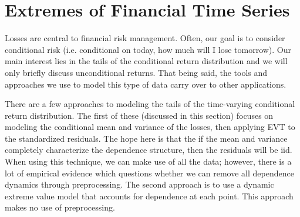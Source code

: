 \documentclass{article}
\theoremstyle{definition}
\theoremstyle{definition}
\begin{document}
\section{Extremes of Financial Time Series}
Losses are central to financial risk management. Often, our goal is to consider conditional risk (i.e. conditional on today, how much will I lose tomorrow). Our main interest lies in the tails of the conditional return distribution and we will only briefly discuss unconditional returns. That being said, the tools and approaches we use to model this type of data carry over to other applications. 

There are a few approaches to modeling the tails of the time-varying conditional return distribution. The first of these (discussed in this section) focuses on modeling the conditional mean and variance of the losses, then applying EVT to the standardized residuals. The hope here is that the if the mean and variance completely characterize the dependence structure, then the residuals will be iid. When using this technique, we can make use of all the data; however, there is a lot of empirical evidence which questions whether we can remove all dependence dynamics through preprocessing. The second approach is to use a dynamic extreme value model that accounts for dependence at each point. This approach makes no use of preprocessing.
\end{document}
